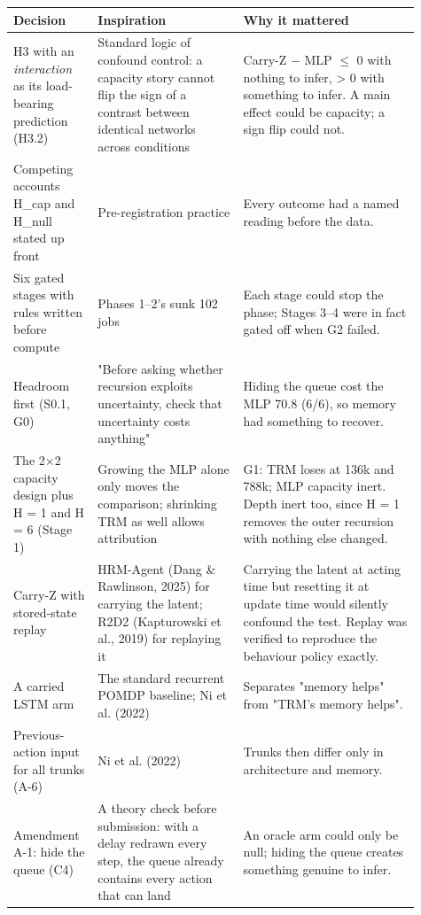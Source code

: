\documentclass[11pt]{article}
\begin{document}
\begin{center}\small\begin{tabular}{>{\raggedright\arraybackslash}p{0.172\linewidth}>{\raggedright\arraybackslash}p{0.331\linewidth}>{\raggedright\arraybackslash}p{0.403\linewidth}}
\toprule
Decision & Inspiration & Why it mattered \\
\midrule
H3 with an \emph{interaction} as its load-bearing prediction (H3.2) & Standard logic of confound control: a capacity story cannot flip the sign of a contrast between identical networks across conditions & Carry-Z $-$ MLP $\leq$ 0 with nothing to infer, > 0 with something to infer. A main effect could be capacity; a sign flip could not. \\
Competing accounts H\_cap and H\_null stated up front & Pre-registration practice & Every outcome had a named reading before the data. \\
Six gated stages with rules written before compute & Phases 1--2's sunk 102 jobs & Each stage could stop the phase; Stages 3--4 were in fact gated off when G2 failed. \\
Headroom first (S0.1, G0) & "Before asking whether recursion exploits uncertainty, check that uncertainty costs anything" & Hiding the queue cost the MLP 70.8 (6/6), so memory had something to recover. \\
The 2$\times$2 capacity design plus H = 1 and H = 6 (Stage 1) & Growing the MLP alone only moves the comparison; shrinking TRM as well allows attribution & G1: TRM loses at 136k and 788k; MLP capacity inert. Depth inert too, since H = 1 removes the outer recursion with nothing else changed. \\
Carry-Z with stored-state replay & HRM-Agent (Dang \& Rawlinson, 2025) for carrying the latent; R2D2 (Kapturowski et al., 2019) for replaying it & Carrying the latent at acting time but resetting it at update time would silently confound the test. Replay was verified to reproduce the behaviour policy exactly. \\
A carried LSTM arm & The standard recurrent POMDP baseline; Ni et al. (2022) & Separates "memory helps" from "TRM's memory helps". \\
Previous-action input for all trunks (A-6) & Ni et al. (2022) & Trunks then differ only in architecture and memory. \\
Amendment A-1: hide the queue (C4) & A theory check before submission: with a delay redrawn every step, the queue already contains every action that can land & An oracle arm could only be null; hiding the queue creates something genuine to infer. \\

\end{tabular}
\end{center}
\end{document}
